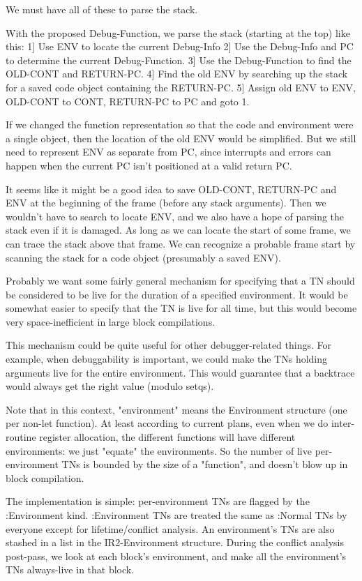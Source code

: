 We must have all of these to parse the stack.

With the proposed Debug-Function, we parse the stack (starting at the top) like
this:
 1] Use ENV to locate the current Debug-Info
 2] Use the Debug-Info and PC to determine the current Debug-Function.
 3] Use the Debug-Function to find the OLD-CONT and RETURN-PC.
 4] Find the old ENV by searching up the stack for a saved code object
    containing the RETURN-PC.
 5] Assign old ENV to ENV, OLD-CONT to CONT, RETURN-PC to PC and goto 1.

If we changed the function representation so that the code and environment were
a single object, then the location of the old ENV would be simplified.  But we
still need to represent ENV as separate from PC, since interrupts and errors
can happen when the current PC isn't positioned at a valid return PC.

It seems like it might be a good idea to save OLD-CONT, RETURN-PC and ENV at
the beginning of the frame (before any stack arguments).  Then we wouldn't have
to search to locate ENV, and we also have a hope of parsing the stack even if
it is damaged.  As long as we can locate the start of some frame, we can trace
the stack above that frame.  We can recognize a probable frame start by
scanning the stack for a code object (presumably a saved ENV).

 Probably we want some fairly general
mechanism for specifying that a TN should be considered to be live for the
duration of a specified environment.  It would be somewhat easier to specify
that the TN is live for all time, but this would become very space-inefficient
in large block compilations.

This mechanism could be quite useful for other debugger-related things.  For
example, when debuggability is important, we could make the TNs holding
arguments live for the entire environment.  This would guarantee that a
backtrace would always get the right value (modulo setqs).  

Note that in this context, "environment" means the Environment structure (one
per non-let function).  At least according to current plans, even when we do
inter-routine register allocation, the different functions will have different
environments: we just "equate" the environments.  So the number of live
per-environment TNs is bounded by the size of a "function", and doesn't blow up
in block compilation.

The implementation is simple: per-environment TNs are flagged by the
:Environment kind.  :Environment TNs are treated the same as :Normal TNs by
everyone except for lifetime/conflict analysis.  An environment's TNs are also
stashed in a list in the IR2-Environment structure.  During the conflict
analysis post-pass, we look at each block's environment, and make all the
environment's TNs always-live in that block.

